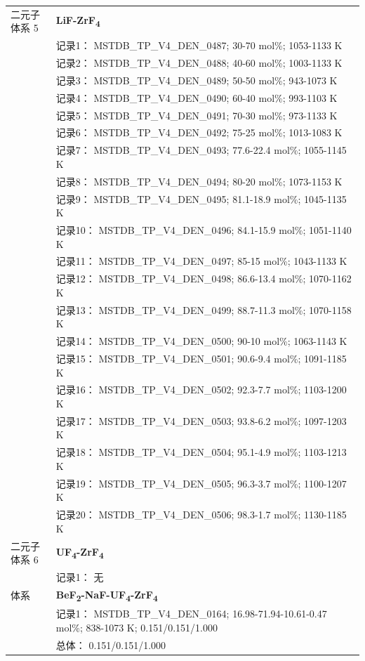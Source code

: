 \documentclass[12pt]{article}
\begin{document}
{\begin{longtable}[]{@{}
  >{\raggedright\arraybackslash}p{}
  >{\raggedright\arraybackslash}p{}@{}}
二元子体系 5  & \textbf{LiF-ZrF\textsubscript{4}} \\
 & 记录1： MSTDB\_TP\_V4\_DEN\_0487; 30-70 mol\%; 1053-1133 K \\
 & 记录2： MSTDB\_TP\_V4\_DEN\_0488; 40-60 mol\%; 1003-1133 K \\
 & 记录3： MSTDB\_TP\_V4\_DEN\_0489; 50-50 mol\%; 943-1073 K \\
 & 记录4： MSTDB\_TP\_V4\_DEN\_0490; 60-40 mol\%; 993-1103 K \\
 & 记录5： MSTDB\_TP\_V4\_DEN\_0491; 70-30 mol\%; 973-1133 K \\
 & 记录6： MSTDB\_TP\_V4\_DEN\_0492; 75-25 mol\%; 1013-1083 K \\
 & 记录7： MSTDB\_TP\_V4\_DEN\_0493; 77.6-22.4 mol\%; 1055-1145 K \\
 & 记录8： MSTDB\_TP\_V4\_DEN\_0494; 80-20 mol\%; 1073-1153 K \\
 & 记录9： MSTDB\_TP\_V4\_DEN\_0495; 81.1-18.9 mol\%; 1045-1135 K \\
 & 记录10： MSTDB\_TP\_V4\_DEN\_0496; 84.1-15.9 mol\%; 1051-1140 K \\
 & 记录11： MSTDB\_TP\_V4\_DEN\_0497; 85-15 mol\%; 1043-1133 K \\
 & 记录12： MSTDB\_TP\_V4\_DEN\_0498; 86.6-13.4 mol\%; 1070-1162 K \\
 & 记录13： MSTDB\_TP\_V4\_DEN\_0499; 88.7-11.3 mol\%; 1070-1158 K \\
 & 记录14： MSTDB\_TP\_V4\_DEN\_0500; 90-10 mol\%; 1063-1143 K \\
 & 记录15： MSTDB\_TP\_V4\_DEN\_0501; 90.6-9.4 mol\%; 1091-1185 K \\
 & 记录16： MSTDB\_TP\_V4\_DEN\_0502; 92.3-7.7 mol\%; 1103-1200 K \\
 & 记录17： MSTDB\_TP\_V4\_DEN\_0503; 93.8-6.2 mol\%; 1097-1203 K \\
 & 记录18： MSTDB\_TP\_V4\_DEN\_0504; 95.1-4.9 mol\%; 1103-1213 K \\
 & 记录19： MSTDB\_TP\_V4\_DEN\_0505; 96.3-3.7 mol\%; 1100-1207 K \\
 & 记录20： MSTDB\_TP\_V4\_DEN\_0506; 98.3-1.7 mol\%; 1130-1185 K  \\

二元子体系 6 & \textbf{UF\textsubscript{4}-ZrF\textsubscript{4}} \\
 & 记录1： 无 \\
\midrule
体系 & \textbf{BeF\textsubscript{2}-NaF-UF\textsubscript{4}-ZrF\textsubscript{4}} \\
 & 记录1： MSTDB\_TP\_V4\_DEN\_0164; 16.98-71.94-10.61-0.47 mol\%; 838-1073 K; 0.151/0.151/1.000 \\
 & 总体： 0.151/0.151/1.000  \\


\end{longtable}}
\end{document}
